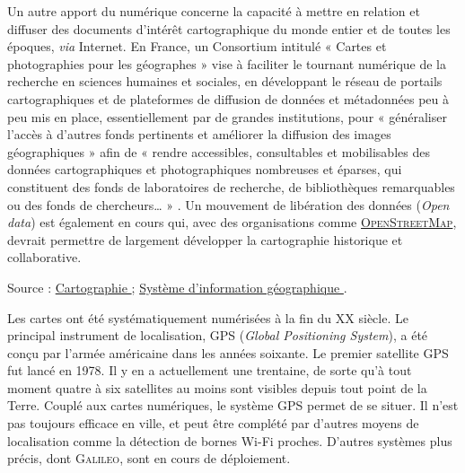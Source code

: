 %
Un autre apport du numérique concerne la capacité à mettre en relation et diffuser des documents d'intérêt cartographique du monde entier et de toutes les époques, \textit{via} Internet. En France, un Consortium intitulé « Cartes et photographies pour les géographes » vise  à faciliter le tournant numérique de la recherche en sciences humaines et sociales, en développant le réseau de portails cartographiques et de plateformes de diffusion de données et métadonnées peu à peu mis en place, essentiellement par de grandes institutions, pour « généraliser l’accès à d’autres fonds pertinents et améliorer la diffusion des images géographiques » afin de « rendre accessibles, consultables et mobilisables des données cartographiques et photographiques nombreuses et éparses, qui constituent des fonds de laboratoires de recherche, de bibliothèques remarquables ou des fonds de chercheurs… » . Un mouvement de libération des données (\textit{Open data}) est également en cours qui, avec des organisations comme \href{https://www.openstreetmap.fr/}{\textsc{OpenStreetMap}}, devrait permettre de largement développer la cartographie historique et collaborative.

\noindent Source : \href{https://fr.wikipedia.org/wiki/Cartographie}{Cartographie \faWikipediaW} ; \href{https://fr.wikipedia.org/wiki/Syst\%C3\%A8me_d\%27information_g\%C3\%A9ographique}{Système d'information géographique \faWikipediaW}.


\begin{tcolorbox}[title={Repères historiques}, toprule=0pt, leftrule=0pt, rightrule=0pt, arc=0pt,
                  fonttitle=\scshape\boxtitlefont,
                  colbacktitle=white, coltitle=firstcolor, colframe=firstcolor, colback=firstcolor!10,
                  breakable, enhanced jigsaw]
Les cartes ont été systématiquement numérisées à la fin du XX siècle.
Le principal instrument de localisation, GPS (\textit{Global Positioning System}), a été conçu par l’armée américaine dans les années soixante. Le premier satellite GPS fut lancé en 1978. Il y en a actuellement une trentaine, de sorte qu’à tout moment quatre à six satellites au moins sont visibles depuis tout point de la Terre. Couplé aux cartes numériques, le système GPS permet de se situer. Il n’est pas toujours efficace en ville, et peut être complété par d’autres moyens de localisation comme la détection de bornes Wi-Fi proches. D’autres systèmes plus précis, dont \textsc{Galileo}, sont en cours de déploiement.
\end{tcolorbox}

